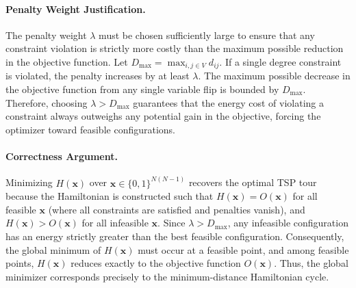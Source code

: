 \documentclass[12pt]{article}
\begin{document}
\paragraph{Penalty Weight Justification.}
The penalty weight $\lambda$ must be chosen sufficiently large to ensure that any constraint violation is strictly more costly than the maximum possible reduction in the objective function. Let $D_{\max} = \max_{i,j \in V} d_{ij}$. If a single degree constraint is violated, the penalty increases by at least $\lambda$. The maximum possible decrease in the objective function from any single variable flip is bounded by $D_{\max}$. Therefore, choosing $\lambda > D_{\max}$ guarantees that the energy cost of violating a constraint always outweighs any potential gain in the objective, forcing the optimizer toward feasible configurations.

\paragraph{Correctness Argument.}
Minimizing $H(\mathbf{x})$ over $\mathbf{x} \in \{0, 1\}^{N(N-1)}$ recovers the optimal TSP tour because the Hamiltonian is constructed such that $H(\mathbf{x}) = O(\mathbf{x})$ for all feasible $\mathbf{x}$ (where all constraints are satisfied and penalties vanish), and $H(\mathbf{x}) > O(\mathbf{x})$ for all infeasible $\mathbf{x}$. Since $\lambda > D_{\max}$, any infeasible configuration has an energy strictly greater than the best feasible configuration. Consequently, the global minimum of $H(\mathbf{x})$ must occur at a feasible point, and among feasible points, $H(\mathbf{x})$ reduces exactly to the objective function $O(\mathbf{x})$. Thus, the global minimizer corresponds precisely to the minimum-distance Hamiltonian cycle.
\end{document}

